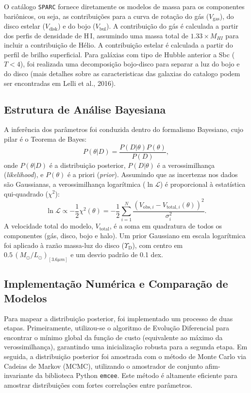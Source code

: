 \documentclass[a4paper]{article}
\begin{document}
O catálogo \texttt{SPARC} fornece diretamente os modelos de massa para os componentes bariônicos, ou seja, as contribuições para a curva de rotação do gás ($V_{\text{gas}}$), do disco estelar ($V_{\text{disk}}$) e do bojo ($V_{\text{bul}}$). A contribuição do gás é calculada a partir dos perfis de densidade de H\,I, assumindo uma massa total de $1.33 \times M_{HI}$ para incluir a contribuição de Hélio. A contribuição estelar é calculada a partir do perfil de brilho superficial. Para galáxias com tipo de Hubble anterior a Sbc ($T<4$), foi realizada uma decomposição bojo-disco para separar a luz do bojo e do disco (mais detalhes sobre as caracteristicas das galaxias do catalogo podem ser encontradas em Lelli et al., 2016).

\subsection{Estrutura de Análise Bayesiana}
A inferência dos parâmetros foi conduzida dentro do formalismo Bayesiano, cujo pilar é o Teorema de Bayes:
\begin{equation}
    P(\theta|D) = \frac{P(D|\theta) P(\theta)}{P(D)},
\end{equation}
onde $P(\theta|D)$ é a distribuição posterior, $P(D|\theta)$ é a verossimilhança (\textit{likelihood}), e $P(\theta)$ é a priori (\textit{prior}). Assumindo que as incertezas nos dados são Gaussianas, a verossimilhança logarítmica ($\ln\mathcal{L}$) é proporcional à estatística qui-quadrado ($\chi^2$):
\begin{equation}
    \ln\mathcal{L} \propto -\frac{1}{2} \chi^2(\theta) = -\frac{1}{2} \sum_{i=1}^{N} \frac{\left(V_{\text{obs},i} - V_{\text{total},i}(\theta)\right)^2}{\sigma_i^2}.
\end{equation}
A velocidade total do modelo, $V_{\text{total}}$, é a soma em quadratura de todos os componentes (gás, disco, bojo e halo). Um prior Gaussiano em escala logarítmica foi aplicado à razão massa-luz do disco ($\Upsilon_{\text{D}}$), com centro em $0.5\,(M_\odot/L_\odot)_{[3.6 \mu m]}$ e um desvio padrão de 0.1 dex.

\subsection{Implementação Numérica e Comparação de Modelos}
Para mapear a distribuição posterior, foi implementado um processo de duas etapas. Primeiramente, utilizou-se o algoritmo de Evolução Diferencial para encontrar o mínimo global da função de custo (equivalente ao máximo da verossimilhança), garantindo uma inicialização robusta para a segunda etapa. Em seguida, a distribuição posterior foi amostrada com o método de Monte Carlo via Cadeias de Markov (MCMC), utilizando o amostrador de conjunto afim-invariante da biblioteca Python \texttt{emcee}. Este método é altamente eficiente para amostrar distribuições com fortes correlações entre parâmetros.
\end{document}
